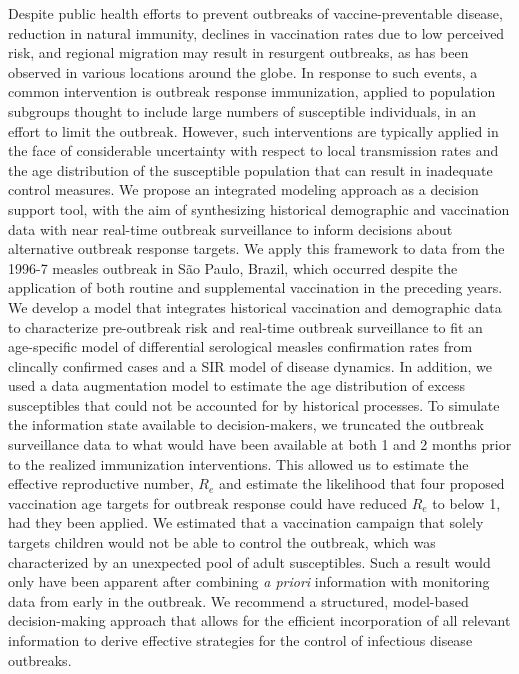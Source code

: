 Despite public health efforts to prevent outbreaks of vaccine-preventable disease, reduction in natural immunity, declines in vaccination rates due to low perceived risk, and regional migration may result in resurgent outbreaks, as has been observed in various locations around the globe. In response to such events, a common intervention is outbreak response immunization, applied to population subgroups thought to include large numbers of susceptible individuals, in an effort to limit the outbreak. However, such interventions are typically applied in the face of considerable uncertainty with respect to local transmission rates and the age distribution of the susceptible population that can result in inadequate control measures. We propose an integrated modeling approach as a decision support tool, with the aim of synthesizing historical demographic and vaccination data with near real-time outbreak surveillance to inform decisions about alternative outbreak response targets. We apply this framework to data from the 1996-7 measles outbreak in S\~{a}o Paulo, Brazil, which occurred despite the application of both routine and supplemental vaccination in the preceding years. We develop a model that integrates historical vaccination and demographic data to characterize pre-outbreak risk and real-time outbreak surveillance to fit an age-specific model of differential serological measles confirmation rates from clincally confirmed cases and a SIR model of disease dynamics.  In addition, we used a data augmentation model to estimate the age distribution of excess susceptibles that could not be accounted for by historical processes. To simulate the information state available to decision-makers, we truncated the outbreak surveillance data to what would have been available at both 1 and 2 months prior to the realized immunization interventions. This allowed us to estimate the effective reproductive number, \(R_e\) and estimate the likelihood that four proposed vaccination age targets for outbreak response could have reduced \(R_e\) to below 1, had they been applied.  We estimated that a vaccination campaign that solely targets children would not be able to control the outbreak, which was characterized by an unexpected pool of adult susceptibles. Such a result would only have been apparent after combining \textit{a priori} information with monitoring data from early in the outbreak. We recommend a structured, model-based decision-making approach that allows for the efficient incorporation of all relevant information to derive effective strategies for the control of infectious disease outbreaks.